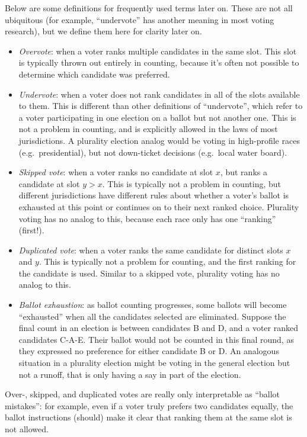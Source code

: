 \documentclass[12pt,twoside]{reedthesis}
\theoremstyle{definition}
\theoremstyle{definition}
\theoremstyle{definition}
\theoremstyle{remark}
\begin{document}
Below are some definitions for frequently used terms later on. These are
not all ubiquitous (for example, ``undervote'' has another meaning in
most voting research), but we define them here for clarity later on.
\begin{itemize}
\item
  \emph{Overvote}: when a voter ranks multiple candidates in the same
  slot. This slot is typically thrown out entirely in counting, because
  it's often not possible to determine which candidate was preferred.
\item
  \emph{Undervote}: when a voter does not rank candidates in all of the
  slots available to them. This is different than other definitions of
  ``undervote'', which refer to a voter participating in one election on
  a ballot but not another one. This is not a problem in counting, and
  is explicitly allowed in the laws of most jurisdictions. A plurality
  election analog would be voting in high-profile races
  (e.g.~presidential), but not down-ticket decisions (e.g.~local water
  board).
\item
  \emph{Skipped vote}: when a voter ranks no candidate at slot \(x\),
  but ranks a candidate at slot \(y > x\). This is typically not a
  problem in counting, but different jurisdictions have different rules
  about whether a voter's ballot is exhausted at this point or continues
  on to their next ranked choice. Plurality voting has no analog to
  this, because each race only has one ``ranking'' (first!).
\item
  \emph{Duplicated vote}: when a voter ranks the same candidate for
  distinct slots \(x\) and \(y\). This is typically not a problem for
  counting, and the first ranking for the candidate is used. Similar to
  a skipped vote, plurality voting has no analog to this.
\item
  \emph{Ballot exhaustion}: as ballot counting progresses, some ballots
  will become ``exhausted'' when all the candidates selected are
  eliminated. Suppose the final count in an election is between
  candidates B and D, and a voter ranked candidates C-A-E. Their ballot
  would not be counted in this final round, as they expressed no
  preference for either candidate B or D. An analogous situation in a
  plurality election might be voting in the general election but not a
  runoff, that is only having a say in part of the election.
\end{itemize}
Over-, skipped, and duplicated votes are really only interpretable as
``ballot mistakes'': for example, even if a voter truly prefers two
candidates equally, the ballot instructions (should) make it clear that
ranking them at the same slot is not allowed.
\end{document}
